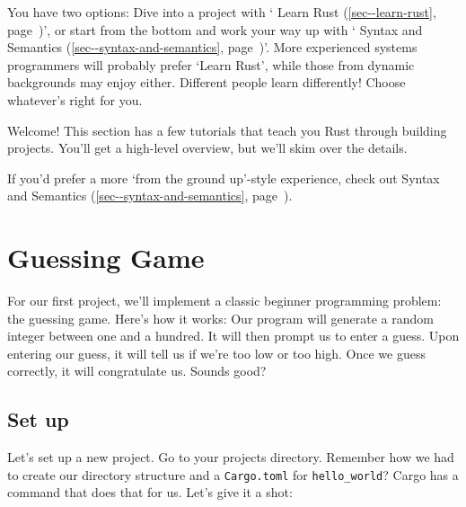 \documentclass[a4paper,]{book}
\renewcommand*{\hyperref}[2][\ar]{%
  \def\ar{#2}%
  #2 (\autoref{#1}, page~\pageref{#1})}
\newenvironment{Shaded}{\begin{snugshade}}{\end{snugshade}}
\newcommand{\KeywordTok}[1]{\textcolor[rgb]{0.13,0.29,0.53}{\textbf{{#1}}}}
\newcommand{\NormalTok}[1]{{#1}}
\begin{document}
You have two options: Dive into a project with
`\hyperref[sec--learn-rust]{Learn Rust}', or start from the bottom and
work your way up with `\hyperref[sec--syntax-and-semantics]{Syntax and
Semantics}'. More experienced systems programmers will probably prefer
`Learn Rust', while those from dynamic backgrounds may enjoy either.
Different people learn differently! Choose whatever's right for you.


Welcome! This section has a few tutorials that teach you Rust through
building projects. You'll get a high-level overview, but we'll skim over
the details.

If you'd prefer a more `from the ground up'-style experience, check out
\hyperref[sec--syntax-and-semantics]{Syntax and Semantics}.

\section{Guessing Game}\label{sec--guessing-game}

For our first project, we'll implement a classic beginner programming
problem: the guessing game. Here's how it works: Our program will
generate a random integer between one and a hundred. It will then prompt
us to enter a guess. Upon entering our guess, it will tell us if we're
too low or too high. Once we guess correctly, it will congratulate us.
Sounds good?

\subsection{Set up}\label{set-up}

Let's set up a new project. Go to your projects directory. Remember how
we had to create our directory structure and a \texttt{Cargo.toml} for
\texttt{hello\_world}? Cargo has a command that does that for us. Let's
give it a shot:

\begin{Shaded}
\end{Shaded}
\end{document}

